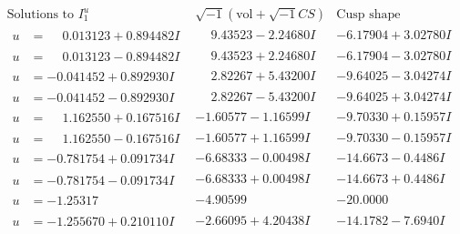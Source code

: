 \documentclass[1p]{elsarticle_modified}
\theoremstyle{definition}
\newcommand{\I}{\sqrt{-1}}
\begin{document}
$$\begin{array}{c|c|c}  
\text{Solutions to }I^u_{1}& \I (\text{vol} + \sqrt{-1}CS) & \text{Cusp shape}\\
 \hline 
\begin{aligned}
u &= \phantom{-}0.013123 + 0.894482 I\end{aligned}
 & \phantom{-}9.43523 - 2.24680 I & -6.17904 + 3.02780 I \\ \hline\begin{aligned}
u &= \phantom{-}0.013123 - 0.894482 I\end{aligned}
 & \phantom{-}9.43523 + 2.24680 I & -6.17904 - 3.02780 I \\ \hline\begin{aligned}
u &= -0.041452 + 0.892930 I\end{aligned}
 & \phantom{-}2.82267 + 5.43200 I & -9.64025 - 3.04274 I \\ \hline\begin{aligned}
u &= -0.041452 - 0.892930 I\end{aligned}
 & \phantom{-}2.82267 - 5.43200 I & -9.64025 + 3.04274 I \\ \hline\begin{aligned}
u &= \phantom{-}1.162550 + 0.167516 I\end{aligned}
 & -1.60577 - 1.16599 I & -9.70330 + 0.15957 I \\ \hline\begin{aligned}
u &= \phantom{-}1.162550 - 0.167516 I\end{aligned}
 & -1.60577 + 1.16599 I & -9.70330 - 0.15957 I \\ \hline\begin{aligned}
u &= -0.781754 + 0.091734 I\end{aligned}
 & -6.68333 - 0.00498 I & -14.6673 - 0.4486 I \\ \hline\begin{aligned}
u &= -0.781754 - 0.091734 I\end{aligned}
 & -6.68333 + 0.00498 I & -14.6673 + 0.4486 I \\ \hline\begin{aligned}
u &= -1.25317\phantom{ +0.000000I}\end{aligned}
 & -4.90599\phantom{ +0.000000I} & -20.0000\phantom{ +0.000000I} \\ \hline\begin{aligned}
u &= -1.255670 + 0.210110 I\end{aligned}
 & -2.66095 + 4.20438 I & -14.1782 - 7.6940 I \\ \hline\begin{aligned}

\end{aligned}
\end{array}$$
\end{document}
